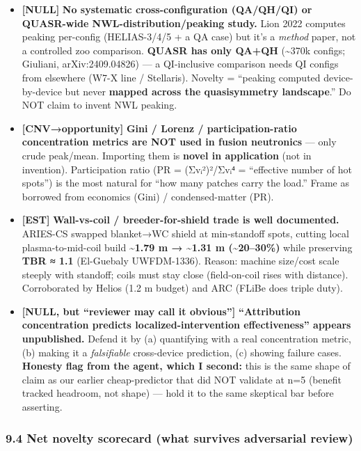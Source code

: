 \documentclass[
]{article}
\providecommand{\tightlist}{%
  \setlength{\itemsep}{0pt}\setlength{\parskip}{0pt}}
\begin{document}
\begin{itemize}
\tightlist
\item
  \textbf{{[}NULL{]}} \textbf{No systematic cross-configuration
  (QA/QH/QI) or QUASR-wide NWL-distribution/peaking study.} Lion 2022
  computes peaking per-config (HELIAS-3/4/5 + a QA case) but it's a
  \emph{method} paper, not a controlled zoo comparison. \textbf{QUASR
  has only QA+QH} (\textasciitilde370k configs; Giuliani,
  arXiv:2409.04826) --- a QI-inclusive comparison needs QI configs from
  elsewhere (W7-X line / Stellaris). Novelty = ``peaking computed
  device-by-device but never \textbf{mapped across the quasisymmetry
  landscape}.'' Do NOT claim to invent NWL peaking.
\item
  \textbf{{[}CNV→opportunity{]}} \textbf{Gini / Lorenz /
  participation-ratio concentration metrics are NOT used in fusion
  neutronics} --- only crude peak/mean. Importing them is \textbf{novel
  in application} (not in invention). Participation ratio (PR =
  (Σvᵢ²)²/Σvᵢ⁴ = ``effective number of hot spots'') is the most natural
  for ``how many patches carry the load.'' Frame as borrowed from
  economics (Gini) / condensed-matter (PR).
\item
  \textbf{{[}EST{]}} \textbf{Wall-vs-coil / breeder-for-shield trade is
  well documented.} ARIES-CS swapped blanket→WC shield at min-standoff
  spots, cutting local plasma-to-mid-coil build
  \textbf{\textasciitilde1.79 m → \textasciitilde1.31 m
  (\textasciitilde20--30\%)} while preserving \textbf{TBR ≈ 1.1}
  (El-Guebaly UWFDM-1336). Reason: machine size/cost scale steeply with
  standoff; coils must stay close (field-on-coil rises with distance).
  Corroborated by Helios (1.2 m budget) and ARC (FLiBe does triple
  duty).
\item
  \textbf{{[}NULL, but ``reviewer may call it obvious''{]}}
  \textbf{``Attribution concentration predicts localized-intervention
  effectiveness'' appears unpublished.} Defend it by (a) quantifying
  with a real concentration metric, (b) making it a \emph{falsifiable}
  cross-device prediction, (c) showing failure cases. \textbf{Honesty
  flag from the agent, which I second:} this is the same shape of claim
  as our earlier cheap-predictor that did NOT validate at n=5 (benefit
  tracked headroom, not shape) --- hold it to the same skeptical bar
  before asserting.
\end{itemize}

\subsubsection{9.4 Net novelty scorecard (what survives adversarial
review)}\label{net-novelty-scorecard-what-survives-adversarial-review}
\end{document}
